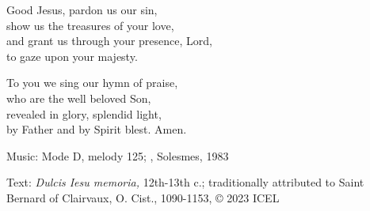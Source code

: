 \hymn



\begin{underhymnverse}
Good Jesus, pardon us our sin,\\
show us the treasures of your love,\\
and grant us through your presence, Lord,\\
to gaze upon your majesty.

To you we sing our hymn of praise,\\
who are the well beloved Son,\\
revealed in glory, splendid light,\\
by Father and by Spirit blest. Amen.
\end{underhymnverse}

\begin{hymnsource}
Music: Mode D, melody 125; , Solesmes, 1983

Text: \emph{Dulcis Iesu memoria,} 12th-13th c.; traditionally attributed to Saint Bernard of Clairvaux, O. Cist., 1090-1153, © 2023 ICEL
\end{hymnsource}
